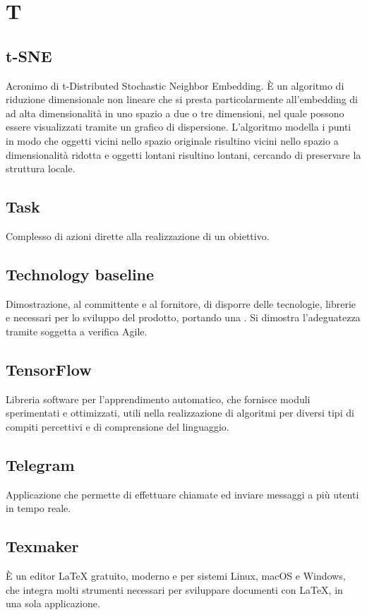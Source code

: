 \section*{T}
\markright{}

\subsection*{t-SNE}
Acronimo di t-Distributed Stochastic Neighbor Embedding. È un algoritmo di riduzione dimensionale non lineare che si presta particolarmente all'embedding di  ad alta dimensionalità in uno spazio a due o tre dimensioni, nel quale possono essere visualizzati tramite un grafico di dispersione. L'algoritmo modella i punti in modo che oggetti vicini nello spazio originale risultino vicini nello spazio a dimensionalità ridotta e oggetti lontani risultino lontani, cercando di preservare la struttura locale.

\subsection*{Task}
Complesso di azioni dirette alla realizzazione di un obiettivo.

\subsection*{Technology baseline}
Dimostrazione, al committente e al fornitore, di disporre delle tecnologie, librerie e  necessari per lo sviluppo del prodotto, portando una . Si dimostra l'adeguatezza tramite  soggetta a verifica Agile.

\subsection*{TensorFlow}
Libreria software  per l'apprendimento automatico, che fornisce moduli sperimentati e ottimizzati, utili nella realizzazione di algoritmi per diversi tipi di compiti percettivi e di comprensione del linguaggio.

\subsection*{Telegram}
Applicazione  che permette di effettuare chiamate ed inviare messaggi a più utenti in tempo reale.

\subsection*{Texmaker}
È un editor \LaTeX{} gratuito, moderno e  per sistemi Linux, macOS e Windows, che integra molti strumenti necessari per sviluppare documenti con \LaTeX{}, in una sola applicazione.

